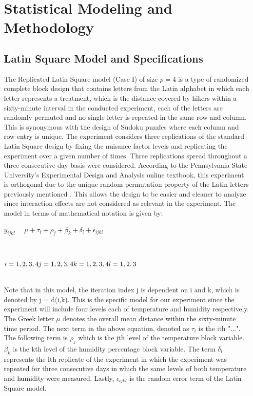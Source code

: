 

\chapter{Statistical Modeling and Methodology}
\label{chapter2}
\thispagestyle{empty}

\section{Latin Square Model and Specifications}
The Replicated Latin Square model (Case I) of size $p=4$ is a type of randomized complete block design that contains letters from the Latin alphabet in which each letter represents a treatment, which is the distance covered by hikers within a sixty-minute interval in the conducted experiment, each of the letters are randomly permuted and no single letter is repeated in the same row and column. This is synonymous with the design of Sudoku puzzles where each column and row entry is unique. The experiment considers three replications of the standard Latin Square design by fixing the nuisance factor levels and replicating the experiment over a given number of times. Three replications spread throughout a three consecutive day basis were considered. According to the Pennsylvania State University's Experimental Design and Analysis online textbook, this experiment is orthogonal due to the unique random permutation property of the Latin letters previously mentioned \cite{key2}. This allows the design to be easier and cleaner to analyze since interaction effects are not considered as relevant in the experiment. The model in terms of mathematical notation is given by:\\
\centerline{$y_{ijkl} = \mu + \tau_{i} + \rho_{j} + \beta_{k} + \delta_{l} + \epsilon_{ijkl}$}\\
\centerline{$i = 1,2,3,4 \\
j = 1,2,3,4 \\
k = 1,2,3,4\\
l = 1,2,3$}\\
Note that in this model, the iteration index j is dependent on i and k, which is denoted by j = d(i,k). This is the specific model for our experiment since the experiment will include four levels each of temperature and humidity respectively. The Greek letter $\mu$ denotes the overall mean distance within the sixty-minute time period. The next term in the above equation, denoted as $\tau_{i}$ is the ith "...". The following term is $\rho_{j}$ which is the jth level of the temperature block variable. $\beta_{k}$ is the kth level of the humidity percentage block variable. The term $\delta_{l}$ represents the lth replicate of the experiment in which the experiment was repeated for three consecutive days in which the same levels of both temperature and humidity were measured. Lastly, $\epsilon_{ijkl}$ is the random error term of the Latin Square model.\\\\
